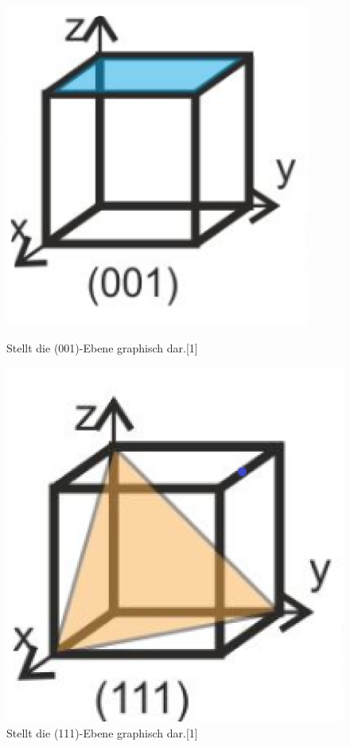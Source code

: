 \begin{figure}[h!]
    \centering
        \begin{minipage}[t]{0.45\linewidth}
            \centering
            \includegraphics[scale = 0.4]{001.png}
            \caption{Stellt die (001)-Ebene graphisch dar.[1]}
            \label{A1}
        \end{minipage}
        \hfill
        \begin{minipage}[t]{0.45\linewidth}
            \centering
            \includegraphics[scale = 0.25]{111.png}
            \caption{Stellt die (111)-Ebene graphisch dar.[1]}
            \label{A2}
        \end{minipage}
\end{figure}
